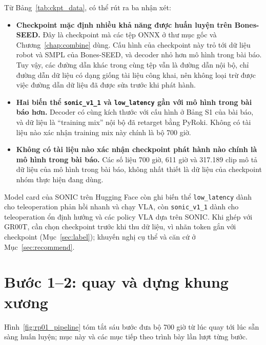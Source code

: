 \documentclass[12pt,a4paper,oneside]{report}
\newcommand{\code}[1]{\texttt{#1}}
\begin{document}
Từ Bảng~\ref{tab:ckpt_data}, có thể rút ra ba nhận xét:
\begin{itemize}
\item \textbf{Checkpoint mặc định nhiều khả năng được huấn luyện trên Bones-SEED.} Đây là checkpoint mà các tệp ONNX ở thư mục gốc và Chương~\ref{chap:combine} dùng. Cấu hình của checkpoint này trỏ tới dữ liệu robot và SMPL của Bones-SEED, và decoder nhỏ hơn mô hình trong bài báo. Tuy vậy, các đường dẫn khác trong cùng tệp vẫn là đường dẫn nội bộ, chỉ đường dẫn dữ liệu có dạng giống tài liệu công khai, nên không loại trừ được việc đường dẫn dữ liệu đã được sửa trước khi phát hành.
\item \textbf{Hai biến thể \code{sonic\_v1\_1} và \code{low\_latency} gần với mô hình trong bài báo hơn.} Decoder có cùng kích thước với cấu hình ở Bảng S1 của bài báo, và dữ liệu là ``training mix'' nội bộ đã retarget bằng PyRoki. Không có tài liệu nào xác nhận training mix này chính là bộ 700 giờ.
\item \textbf{Không có tài liệu nào xác nhận checkpoint phát hành nào chính là mô hình trong bài báo.} Các số liệu 700 giờ, 611 giờ và 317.189 clip mô tả dữ liệu của mô hình trong bài báo, không nhất thiết là dữ liệu của checkpoint nhóm thực hiện đang dùng.
\end{itemize}
Model card của SONIC trên Hugging Face còn ghi biến thể \code{low\_latency} dành cho teleoperation phản hồi nhanh và chạy VLA, còn \code{sonic\_v1\_1} dành cho teleoperation ổn định hướng và các policy VLA dựa trên SONIC. Khi ghép với GR00T, cần chọn checkpoint trước khi thu dữ liệu, vì nhãn token gắn với checkpoint (Mục~\ref{sec:label}); khuyến nghị cụ thể và căn cứ ở Mục~\ref{sec:recommend}.

\section{Bước 1--2: quay và dựng khung xương}
\label{sec:rp01_capture}

Hình~\ref{fig:rp01_pipeline} tóm tắt sáu bước đưa bộ 700 giờ từ lúc quay tới lúc sẵn sàng huấn luyện; mục này và các mục tiếp theo trình bày lần lượt từng bước.
\end{document}
